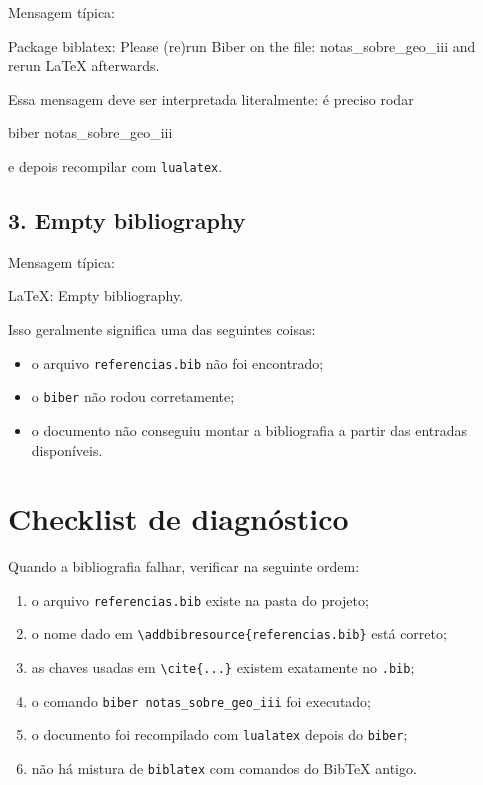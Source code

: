 \documentclass[12pt,a4paper]{article}
\newcommand{\arquivo}[1]{\texttt{#1}}
\newcommand{\comando}[1]{\texttt{#1}}
\begin{document}
Mensagem típica:

\begin{bloco}
Package biblatex: Please (re)run Biber on the file:
notas_sobre_geo_iii
and rerun LaTeX afterwards.
\end{bloco}

Essa mensagem deve ser interpretada literalmente: é preciso rodar

\begin{bloco}
biber notas_sobre_geo_iii
\end{bloco}

e depois recompilar com \comando{lualatex}.

\subsection*{3. Empty bibliography}

Mensagem típica:

\begin{bloco}
LaTeX: Empty bibliography.
\end{bloco}

Isso geralmente significa uma das seguintes coisas:

\begin{itemize}[leftmargin=1.5cm]
    \item o arquivo \arquivo{referencias.bib} não foi encontrado;
    \item o \comando{biber} não rodou corretamente;
    \item o documento não conseguiu montar a bibliografia a partir das entradas disponíveis.
\end{itemize}

\section{Checklist de diagnóstico}

Quando a bibliografia falhar, verificar na seguinte ordem:

\begin{enumerate}[leftmargin=1.5cm]
    \item o arquivo \arquivo{referencias.bib} existe na pasta do projeto;
    \item o nome dado em \comando{\textbackslash addbibresource\{referencias.bib\}} está correto;
    \item as chaves usadas em \comando{\textbackslash cite\{...\}} existem exatamente no \arquivo{.bib};
    \item o comando \comando{biber notas_sobre_geo_iii} foi executado;
    \item o documento foi recompilado com \comando{lualatex} depois do \comando{biber};
    \item não há mistura de \texttt{biblatex} com comandos do BibTeX antigo.
\end{enumerate}
\end{document}
